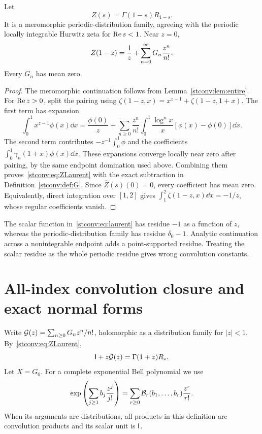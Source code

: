 \begin{lemma}\label{stconv:lem:Laurentdist}
Let
\[
 Z(s)=\Gamma(1-s)R_{1-s}.
\]
It is a meromorphic periodic-distribution family, agreeing with the
periodic locally integrable Hurwitz zeta for $\operatorname{Re} s<1$. Near $z=0$,
\begin{equation}\label{stconv:eq:ZLaurent}
 Z(1-z)=\frac{\mathsf I}{z}+\sum_{n=0}^\infty G_n\frac{z^n}{n!}.
\end{equation}
Every $G_n$ has mean zero.
\end{lemma}
\begin{proof}
The meromorphic continuation follows from Lemma~\ref{stconv:lem:entire}. For
$\operatorname{Re} z>0$, split the pairing using
$\zeta(1-z,x)=x^{z-1}+\zeta(1-z,1+x)$. The first term has expansion
\[
 \int_0^1x^{z-1}\phi(x)\dd x
 =\frac{\phi(0)}z+
   \sum_{n\ge0}\frac{z^n}{n!}
   \int_0^1\frac{\log^n x}{x}[\phi(x)-\phi(0)]\dd x.
\]
The second term contributes $-z^{-1}\int_0^1\phi$ and the coefficients
$\int_0^1\gamma_n(1+x)\phi(x)\dd x$. These expansions converge locally
near zero after pairing, by the same endpoint domination used above.
Combining them proves~\eqref{stconv:eq:ZLaurent} with the exact subtraction in
Definition~\ref{stconv:def:G}. Since $\widehat Z(s)(0)=0$, every coefficient has
mean zero. Equivalently, direct integration over $[1,2]$ gives
$\int_1^2\zeta(1-z,x)\dd x=-1/z$, whose regular coefficients vanish.
\end{proof}

\begin{remark}
The scalar function in~\eqref{stconv:eq:laurent} has residue $-1$ as a function
of $z$, whereas the periodic-distribution family has residue
$\delta_0-1$. Analytic continuation across a nonintegrable endpoint adds
a point-supported residue. Treating the scalar residue as the whole
periodic residue gives wrong convolution constants.
\end{remark}

\section{All-index convolution closure and exact normal forms}
\label{stconv:sec:algebra}
Write $\mathcal G(z)=\sum_{n\ge0}G_nz^n/n!$, holomorphic as a distribution family
for $|z|<1$. By~\eqref{stconv:eq:ZLaurent},
\begin{equation}\label{stconv:eq:masterG}
 \mathsf I+z\mathcal G(z)=\Gamma(1+z)R_z.
\end{equation}
Let $X=G_0$. For a complete exponential Bell polynomial we use
\begin{equation}\label{stconv:eq:Belldef}
 \exp\left(\sum_{j\ge1}b_j\frac{z^j}{j!}\right)
 =\sum_{r\ge0}\mathcal B_r(b_1,\ldots,b_r)\frac{z^r}{r!}.
\end{equation}
When its arguments are distributions, all products in this definition
are convolution products and its scalar unit is $\mathsf I$.

